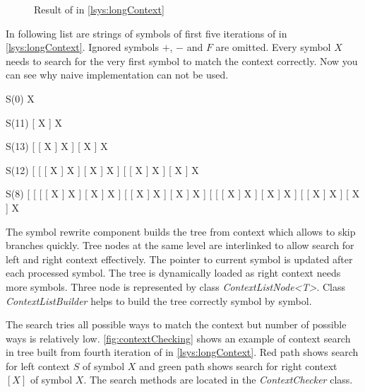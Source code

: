 
\begin{figure}[h]
	 \hfill
	 \hfill
	 \hfill
	 \hfill
	\caption{Result of \lsystem in \autoref{lsys:longContext}}
	\label{fig:longContext}
\end{figure}


In following list are strings of symbols of first five iterations of \lsystem in \autoref{lsys:longContext}.
Ignored symbols $+$, $-$ and $F$ are omitted.
Every symbol $X$ needs to search for the very first symbol to match the context correctly.
Now you can see why naive implementation can not be used.

\begin{enumerate*}
	\item S(0) X
	\item S(11) [ X ] X
	\item S(13) [ [ X ] X ] [ X ] X
	\item S(12) [ [ [ X ] X ] [ X ] X ] [ [ X ] X ] [ X ] X 
	\item S(8) [ [ [ [ X ] X ] [ X ] X ] [ [ X ] X ] [ X ] X ] [ [ [ X ] X ] [ X ] X ] [ [ X ] X ] [ X ] X 
\end{enumerate*}

The symbol rewrite component builds the tree from context which allows to skip branches quickly.
Tree nodes at the same level are interlinked to allow search for left and right context effectively.
The pointer to current symbol is updated after each processed symbol.
The tree is dynamically loaded as right context needs more symbols.
Three node is represented by class \emph{ContextListNode<T>}.
Class \emph{ContextListBuilder} helps to build the tree correctly symbol by symbol.

The search tries all possible ways to match the context but number of possible ways is relatively low.
\autoref{fig:contextChecking} shows an example of context search in tree built from fourth iteration of \lsystem in \autoref{lsys:longContext}.
Red path shows search for left context $S$ of symbol $X$ and green path shows search for right context $[X]$ of symbol $X$.
The search methods are located in the \emph{ContextChecker} class.

